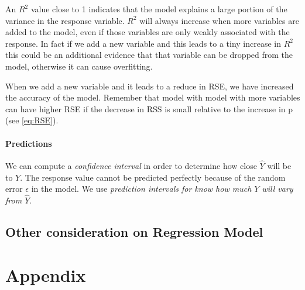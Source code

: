 \documentclass[a4paper]{article}
\begin{document}
							An $R^2$ value close to 1 indicates that the model explains a large portion of the variance in the response variable. $R^2$ will always increase when more variables are added to the model, even if those variables are only weakly associated with the response. In fact if we add a new variable and this leads to a tiny increase in $R^2$ this could be an additional evidence that that variable can be dropped from the model, otherwise it can cause overfitting.
							
							When we add a new variable and it leads to a reduce in RSE, we have increased the accuracy of the model. Remember that model with model with more variables can have higher RSE if the decrease in RSS is small relative to the increase in p (see \ref{eq:RSE}).
							
						\paragraph{Predictions}
							We can compute a \textit{confidence interval} in order to determine how close $\hat{Y}$ will be to $Y$. The response value cannot be predicted perfectly because of the random error $\epsilon$ in the model. We use \textit{prediction intervals for know how much $Y$ will vary from $\hat{Y}$}.
							
							
					\subsection{Other consideration on Regression Model}
					
					
					
				
		
		
	\section{Appendix}
	
		
\end{document}
